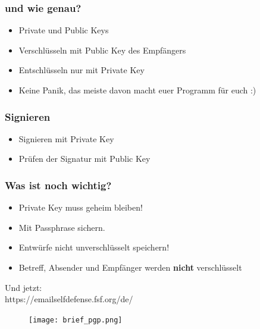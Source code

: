 \documentclass[14pt]{beamer}
\begin{document}
\begin{frame}
    \frametitle{und wie genau?}
    \begin{itemize}
        \item<1-> Private und Public Keys
        \item<1-> Verschlüsseln mit Public Key des Empfängers
        \item<1-> Entschlüsseln nur mit Private Key
        \item<2-> Keine Panik, das meiste davon macht euer Programm für euch :)
    \end{itemize}
    
\end{frame}


\begin{frame}
    \frametitle{Signieren}
    \begin{itemize}
        \item Signieren mit Private Key
        \item Prüfen der Signatur mit Public Key
    \end{itemize}

\end{frame}

\begin{frame}
    \frametitle{Was ist noch wichtig?}
    \begin{itemize}
        \item Private Key muss geheim bleiben!
        \item Mit Passphrase sichern.
        \item Entwürfe nicht unverschlüsselt speichern!
        \item Betreff, Absender und Empfänger werden \textbf{nicht} verschlüsselt
    \end{itemize}

\end{frame}

\begin{frame}
    Und jetzt:\\
    \Large{https://emailselfdefense.fsf.org/de/}
    \begin{figure}
     \texttt{[image: brief\_pgp.png]}
    \end{figure}

\end{frame}
\end{document}
